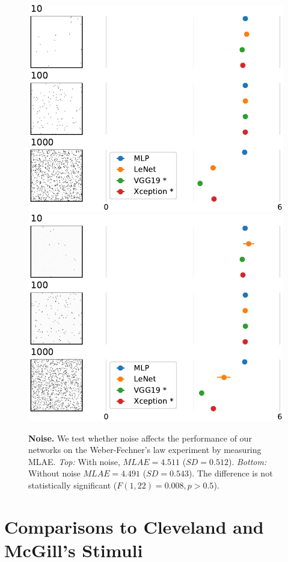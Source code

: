 \documentclass[journal]{vgtc}        %
\begin{document}
\begin{figure}[p]
\centering
\includegraphics[width=.825\linewidth]{../gfx/weber_mlae_no_noise.pdf}\\
\vspace{0.4cm}
\includegraphics[width=.825\linewidth]{../gfx/weber_mlae_noise.pdf}
\caption{\textbf{Noise.} We test whether noise affects the performance of our networks on the Weber-Fechner's law experiment by measuring MLAE. \emph{Top:} With noise, $MLAE=4.511$ ($SD=0.512$). \emph{Bottom:} Without noise $MLAE=4.491$ ($SD=0.543$). The difference is not statistically significant ($F(1,22)=0.008,p>0.5$).}
\label{fig:noise}
\end{figure}

\section{Comparisons to Cleveland and McGill's Stimuli}
\end{document}

